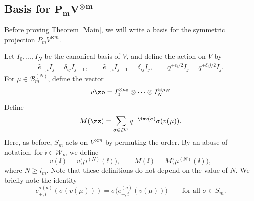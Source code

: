 \subsection[Basis for P\_mV\^\{otimes m\}]{Basis for $\boldsymbol{P_mV^{\otimes m}}$}

Before proving Theorem \ref{Main}, we will write a basis for the symmetric projection $P_mV^{\otimes m}$.

Let $ I_0,\dots,I_N $ be the canonical basis of $ V $, and define the action on $ V $ by 	
\begin{gather}
\hat{e}_{+,i}I_j=\delta_{ij}I_{j-1},\qquad
\hat{e}_{-,i}I_{j-1}=\delta_{ij}I_j,\qquad
q^{\pm \epsilon_i/2}I_j=q^{\pm \delta_ij/2}I_j.\label{21}
\end{gather}
For $\mu \in \mathcal{B}_m^{(N)}$, define the vector
\begin{equation*}%
v\zo =I_0^{\otimes \mu_0} \otimes \dots \otimes I_N^{\otimes \mu_N}
\end{equation*}
Define
\begin{equation*}
M(\zz) = \sum_{\sigma \in D^{\mu}}q^{-\inv (\sigma)} \sigma (v(\mu)).
\end{equation*}
Here, as before, $S_m $ acts on $ V^{\otimes m} $ by permuting the order.
By an abuse of notation, for $\ii \in \mathcal{W}_m$ we define
\[
v(\ii) = v\big(\mu^{(N)}(\ii)\big), \qquad M(\ii) = M\big(\mu^{(N)}(\ii)\big),
\]
where $N \geq i_m$. Note that these definitions do not depend on the value of $N$.
We briefly note the identity
\begin{equation}\label{Brief}
e^{\sigma(a)}_{\pm,i} ( \sigma(v(\mu)) ) = \sigma\big( e^{(a)}_{\pm,i} ( v(\mu) ) \big) \qquad \text{for all } \sigma \in S_m.
\end{equation}

